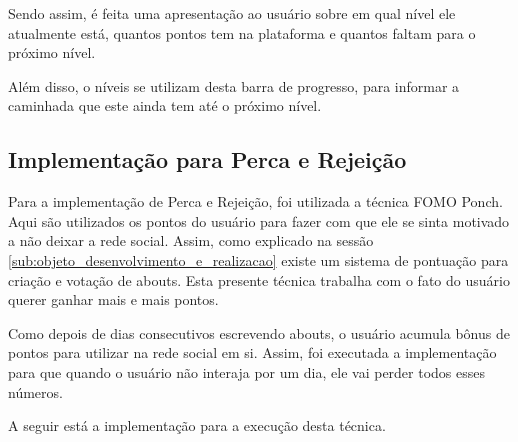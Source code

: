 Sendo assim, é feita uma apresentação ao usuário sobre em qual nível ele atualmente está, quantos
pontos tem na plataforma e quantos faltam para o próximo nível.

Além disso, o níveis se utilizam desta barra de progresso, para informar a caminhada que este ainda
tem até o próximo nível.


\subsection{Implementação para Perca e Rejeição}
\label{sub:implementacao_perca_rejeicao}
Para a implementação de Perca e Rejeição, foi utilizada a técnica FOMO Ponch. Aqui são utilizados os pontos
do usuário para fazer com que ele se sinta motivado a não deixar a rede social. Assim, como explicado na
sessão \ref{sub:objeto_desenvolvimento_e_realizacao}
existe um sistema de pontuação para criação e votação de abouts. Esta presente técnica trabalha com o fato
do usuário querer ganhar mais e mais pontos.

Como depois de dias consecutivos escrevendo abouts, o usuário acumula bônus de pontos para utilizar na rede
social em si. Assim, foi executada a implementação para que quando o usuário não interaja por um dia, ele vai
perder todos esses números.

A seguir está a implementação para a execução desta técnica.

